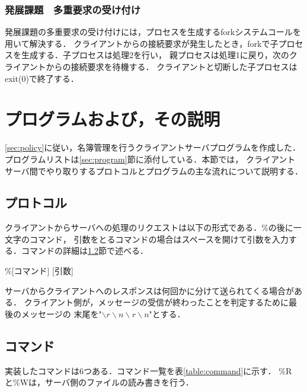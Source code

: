 \documentclass[11pt]{jarticle}
\begin{document}
\subsubsection{発展課題　多重要求の受け付け}

発展課題の多重要求の受け付けには，プロセスを生成するforkシステムコールを用いて解決する．
クライアントからの接続要求が発生したとき，forkで子プロセスを生成する．子プロセスは処理2を行い，
親プロセスは処理1に戻り，次のクライアントからの接続要求を待機する．
クライアントと切断した子プロセスはexit(0)で終了する．

\section{プログラムおよび，その説明}

\ref{sec:policy}に従い，名簿管理を行うクライアントサーバプログラムを作成した．
プログラムリストは\ref{sec:program}節に添付している．本節では，
クライアントサーバ間でやり取りするプロトコルとプログラムの主な流れについて説明する．

\subsection{プロトコル}

クライアントからサーバへの処理のリクエストは以下の形式である．\%の後に一文字のコマンド，
引数をとるコマンドの場合はスペースを開けて引数を入力する．コマンドの詳細は\ref{sec:command}節で述べる．
\begin{center}
    \%[コマンド] [引数]
\end{center}

サーバからクライアントへのレスポンスは何回かに分けて送られてくる場合がある．
クライアント側が，メッセージの受信が終わったことを判定するために最後のメッセージの
末尾を"$\backslash r\backslash n\backslash r\backslash n$"とする．

\subsection{コマンド} \label{sec:command}

実装したコマンドは6つある．コマンド一覧を表\ref{table:command}に示す．
\%Rと\%Wは，サーバ側のファイルの読み書きを行う．
\end{document}
